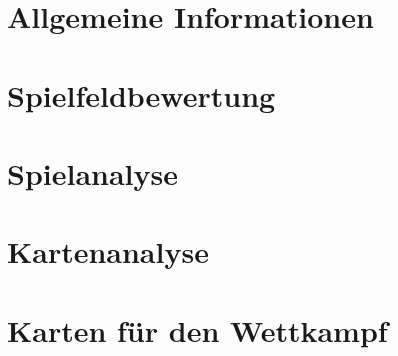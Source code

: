 \documentclass[12pt,a4paper,bibliography=totocnumbered,listof=totocnumbered]{article}
\begin{document}
\section{Allgemeine Informationen}\label{sec:allgemeine-informationen}


\section{Spielfeldbewertung}\label{sec:spielfeldbewertung}


\section{Spielanalyse}\label{sec:spielanalyse}


\section{Kartenanalyse}\label{sec:kartenanalyse}


\section{Karten f\"ur den Wettkampf}\label{sec:wettkampf-karten}


\end{document}
